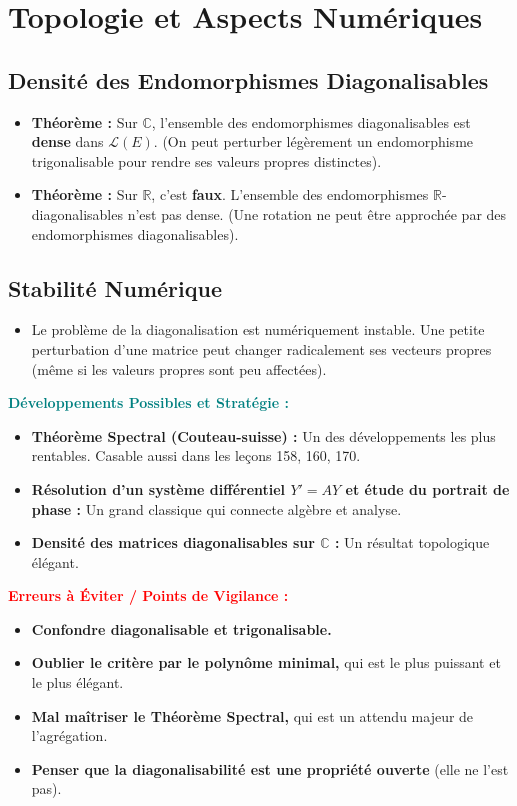 \documentclass[12pt, a4paper, parskip=full]{report}
\theoremstyle{agregstyle}
\newenvironment{developpements}
  {\par\medskip\noindent\begin{oframed}\noindent\textbf{\textcolor{teal}{Développements Possibles et Stratégie :}}}
  {\end{oframed}\par\medskip}
\newenvironment{erreurs}
  {\par\medskip\noindent\begin{oframed}\noindent\textbf{\textcolor{red}{Erreurs à Éviter / Points de Vigilance :}}}
  {\end{oframed}\par\medskip}
\begin{document}
\section{Topologie et Aspects Numériques}
\subsection{Densité des Endomorphismes Diagonalisables}
\begin{itemize}
    \item \textbf{Théorème :} Sur $\mathbb{C}$, l'ensemble des endomorphismes diagonalisables est \textbf{dense} dans $\mathcal{L}(E)$. (On peut perturber légèrement un endomorphisme trigonalisable pour rendre ses valeurs propres distinctes).
    \item \textbf{Théorème :} Sur $\mathbb{R}$, c'est \textbf{faux}. L'ensemble des endomorphismes $\mathbb{R}$-diagonalisables n'est pas dense. (Une rotation ne peut être approchée par des endomorphismes diagonalisables).
\end{itemize}
\subsection{Stabilité Numérique}
\begin{itemize}
    \item Le problème de la diagonalisation est numériquement instable. Une petite perturbation d'une matrice peut changer radicalement ses vecteurs propres (même si les valeurs propres sont peu affectées).
\end{itemize}

\begin{developpements}
    \begin{itemize}
        \item \textbf{Théorème Spectral (Couteau-suisse) :} Un des développements les plus rentables. Casable aussi dans les leçons 158, 160, 170.
        \item \textbf{Résolution d'un système différentiel $Y'=AY$ et étude du portrait de phase :} Un grand classique qui connecte algèbre et analyse.
        \item \textbf{Densité des matrices diagonalisables sur $\mathbb{C}$ :} Un résultat topologique élégant.
    \end{itemize}
\end{developpements}

\begin{erreurs}
    \begin{itemize}
        \item \textbf{Confondre diagonalisable et trigonalisable.}
        \item \textbf{Oublier le critère par le polynôme minimal,} qui est le plus puissant et le plus élégant.
        \item \textbf{Mal maîtriser le Théorème Spectral,} qui est un attendu majeur de l'agrégation.
        \item \textbf{Penser que la diagonalisabilité est une propriété ouverte} (elle ne l'est pas).
    \end{itemize}
\end{erreurs}
\end{document}
